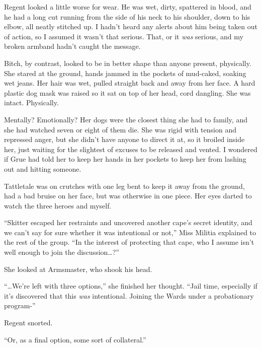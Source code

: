Regent looked a little worse for wear.  He was wet, dirty, spattered in blood, and he had a long cut running from the side of his neck to his shoulder, down to his elbow, all neatly stitched up.  I hadn't heard any alerts about him being taken out of action, so I assumed it wasn't that serious.  That, or it \emph{was} serious, and my broken armband hadn't caught the message.



Bitch, by contrast, looked to be in better shape than anyone present, physically.  She stared at the ground, hands jammed in the pockets of mud-caked, soaking wet jeans.  Her hair was wet, pulled straight back and away from her face.  A hard plastic dog mask was raised so it sat on top of her head, cord dangling.  She was intact.  Physically.



Mentally?  Emotionally?  Her dogs were the closest thing she had to family, and she had watched seven or eight of them die.  She was rigid with tension and repressed anger, but she didn't have anyone to direct it at, so it broiled inside her, just waiting for the slightest of excuses to be released and vented.  I wondered if Grue had told her to keep her hands in her pockets to keep her from lashing out and hitting someone.



Tattletale was on crutches with one leg bent to keep it away from the ground, had a bad bruise on her face, but was otherwise in one piece.  Her eyes darted to watch the three heroes and myself.



``Skitter escaped her restraints and uncovered another cape's secret identity, and we can't say for sure whether it was intentional or not,'' Miss Militia explained to the rest of the group.  ``In the interest of protecting that cape, who I assume isn't well enough to join the discussion\ldots?''



She looked at Armsmaster, who shook his head.



``\ldots{}We're left with three options,'' she finished her thought.  ``Jail time, especially if it's discovered that this \emph{was} intentional.  Joining the Wards under a probationary program-''



Regent snorted.



``Or, as a final option, some sort of collateral.''



